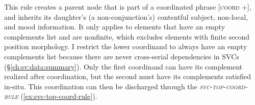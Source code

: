 \ex \label{ex:svc-bottom-coord-rule}
\xe

This rule creates a parent node that is part of a coordinated phrase [\textsc{coord} +], and inherits its daughter's (a non-conjunction's) contentful subject, non-local, and mood information. It only applies to elements that have an empty complements list and are nonfinite, which excludes elements with finite second position morphology. I restrict the lower coordinand to always have an empty complements list because there are never cross-serial dependencies in SVCs (\S\ref{ch:sv:data:summary}). Only the first coordinand can have its complement realized after coordination, but the second must have its complements satisfied in-situ. This coordination can then be discharged through the \textsc{\textit{svc-top-coord-rule}} (\ref{ex:svc-top-coord-rule}).

